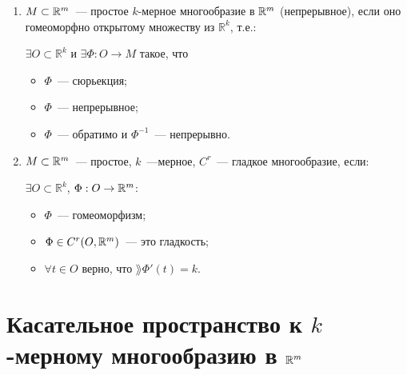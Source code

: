 \documentclass{article}
\begin{document}
        \begin{enumerate}
        
            \item $M \subset \mathbb{R}^m$~--- простое $k$-мерное многообразие в $\mathbb{R}^m$ (непрерывное), если оно гомеоморфно открытому множеству из $\mathbb{R}^k$, т.е.:
            
                $\exists O \subset \mathbb{R}^k$ и $\exists \Phi : O \rightarrow M$ такое, что
            
                \begin{itemize}
            
                    \item $\Phi$~--- сюрьекция;
                
                    \item $\Phi$~--- непрерывное;
                
                    \item $\Phi$~--- обратимо и $\Phi^{-1}$~--- непрерывно.
                
                \end{itemize}
            
            \item $M \subset \mathbb{R}^m$~--- простое, $k$~---мерное, $C^r$~--- гладкое многообразие, если:
            
                $\exists O \subset \mathbb{R}^k$, $\Phi : O \rightarrow \mathbb{R}^m$:
                
                \begin{itemize}
                
                    \item $\Phi$~--- гомеоморфизм;
                    
                    \item $\Phi \in C^r(O, \mathbb{R}^m)$~--- это гладкость;
                    
                    \item $\forall t \in O$ верно, что $\rang \Phi'(t) = k$.
                    
                \end{itemize}
        
        \end{enumerate}
    
    \newpage
    
    \section{Касательное пространство к $k$-мерному многообразию в $\mathbb{R}^m$}
    
\end{document}
